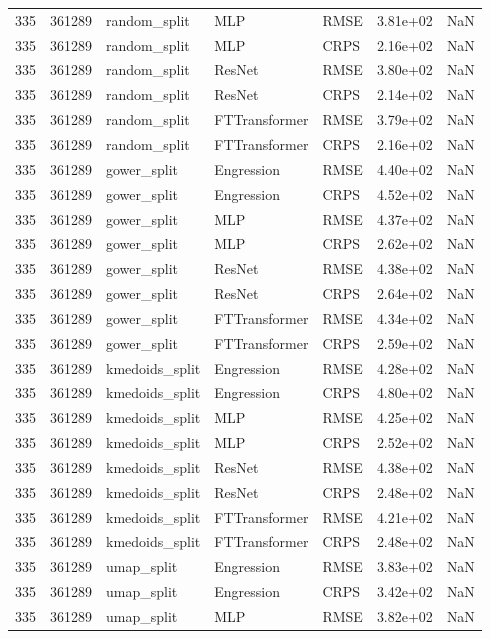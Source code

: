 \begin{tabular}{rrlllrr}
335 & 361289 & random\_split & MLP & RMSE & 3.81e+02 & NaN \\
335 & 361289 & random\_split & MLP & CRPS & 2.16e+02 & NaN \\
335 & 361289 & random\_split & ResNet & RMSE & 3.80e+02 & NaN \\
335 & 361289 & random\_split & ResNet & CRPS & 2.14e+02 & NaN \\
335 & 361289 & random\_split & FTTransformer & RMSE & 3.79e+02 & NaN \\
335 & 361289 & random\_split & FTTransformer & CRPS & 2.16e+02 & NaN \\
335 & 361289 & gower\_split & Engression & RMSE & 4.40e+02 & NaN \\
335 & 361289 & gower\_split & Engression & CRPS & 4.52e+02 & NaN \\
335 & 361289 & gower\_split & MLP & RMSE & 4.37e+02 & NaN \\
335 & 361289 & gower\_split & MLP & CRPS & 2.62e+02 & NaN \\
335 & 361289 & gower\_split & ResNet & RMSE & 4.38e+02 & NaN \\
335 & 361289 & gower\_split & ResNet & CRPS & 2.64e+02 & NaN \\
335 & 361289 & gower\_split & FTTransformer & RMSE & 4.34e+02 & NaN \\
335 & 361289 & gower\_split & FTTransformer & CRPS & 2.59e+02 & NaN \\
335 & 361289 & kmedoids\_split & Engression & RMSE & 4.28e+02 & NaN \\
335 & 361289 & kmedoids\_split & Engression & CRPS & 4.80e+02 & NaN \\
335 & 361289 & kmedoids\_split & MLP & RMSE & 4.25e+02 & NaN \\
335 & 361289 & kmedoids\_split & MLP & CRPS & 2.52e+02 & NaN \\
335 & 361289 & kmedoids\_split & ResNet & RMSE & 4.38e+02 & NaN \\
335 & 361289 & kmedoids\_split & ResNet & CRPS & 2.48e+02 & NaN \\
335 & 361289 & kmedoids\_split & FTTransformer & RMSE & 4.21e+02 & NaN \\
335 & 361289 & kmedoids\_split & FTTransformer & CRPS & 2.48e+02 & NaN \\
335 & 361289 & umap\_split & Engression & RMSE & 3.83e+02 & NaN \\
335 & 361289 & umap\_split & Engression & CRPS & 3.42e+02 & NaN \\
335 & 361289 & umap\_split & MLP & RMSE & 3.82e+02 & NaN \\

\end{tabular}
